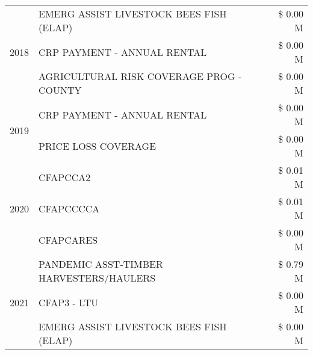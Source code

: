 \begin{tabular}{llr}
\cline{1-3}
\multirow[t]{3}{*}{2018} & EMERG ASSIST LIVESTOCK BEES FISH (ELAP) & \$ 0.00 M \\
 & CRP PAYMENT - ANNUAL RENTAL & \$ 0.00 M \\
 & AGRICULTURAL RISK COVERAGE PROG - COUNTY & \$ 0.00 M \\
\cline{1-3}
\multirow[t]{2}{*}{2019} & CRP PAYMENT - ANNUAL RENTAL & \$ 0.00 M \\
 & PRICE LOSS COVERAGE & \$ 0.00 M \\
\cline{1-3}
\multirow[t]{3}{*}{2020} & CFAPCCA2 & \$ 0.01 M \\
 & CFAPCCCCA & \$ 0.01 M \\
 & CFAPCARES & \$ 0.00 M \\
\cline{1-3}
\multirow[t]{3}{*}{2021} & PANDEMIC ASST-TIMBER HARVESTERS/HAULERS & \$ 0.79 M \\
 & CFAP3 - LTU & \$ 0.00 M \\
 & EMERG ASSIST LIVESTOCK BEES FISH (ELAP) & \$ 0.00 M \\
\cline{1-3}
\bottomrule
\end{tabular}
